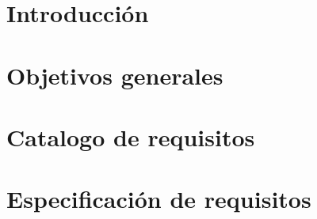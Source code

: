 
\section{Introducción}

\section{Objetivos generales}

\section{Catalogo de requisitos}

\section{Especificación de requisitos}


